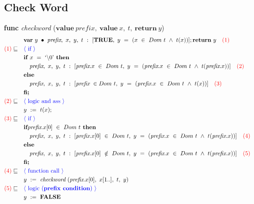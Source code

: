 \documentclass[a4paper, fleqn]{article}
\newcommand{\reason}[1]{\text{\textcolor{blue}{$\langle$ #1 $\rangle$}}}
\newcommand{\num}[1]{\text{\textcolor{red}{(#1)}}}
\begin{document}
\subsection{Check Word}
\textbf{func} \textit{checkword} ($\textbf{value}\ \textit{prefix},\ \textbf{value}\ x,\ t,\ \textbf{return}\ y$)
\begin{align*}
		&\quad \textbf{var}\ y\ \bullet\ \textit{prefix},\ x,\ y,\ t\ :\ [\textbf{TRUE},\ y\ =\ (x\ \in\ Dom\ t\ \land\ t(x))]; \textbf{return}\ y\quad\num{1} \\
		\num{1}\sqsubseteq&\quad\reason{if} \\
		&\quad \textbf{if }x\ =\ \text{`\textbackslash0'}\textbf{ then} \\
		&\qquad \textit{prefix},\ x,\ y,\ t\ :\ [\textit{prefix}.x\ \in\ Dom\ t,\ y\ =\ (\textit{prefix}.x\ \in\ Dom\ t\ \land\ t(\textit{prefix}.x))]\quad\num{2}\\
		&\quad\textbf{else} \\
		&\qquad \textit{prefix},\ x,\ y,\ t\ :\ [\textit{prefix}\ \in Dom\ t,\ y\ =\ (\textit{prefix}.x\ \in\ Dom\ t\ \land\ t(x))] \quad\num{3} \\
		&\quad\textbf{fi;} \\
		\num{2}\sqsubseteq&\quad\reason{logic and ass} \\
		&\quad y\ :=\ t(x); \\
		\num{3}\sqsubseteq&\quad\reason{if} \\
		&\quad\textbf{if} \textit{prefix}.x[0]\ \in\ Dom\ t\textbf{ then} \\
		&\qquad \textit{prefix},\ x,\ y,\ t\ :\ [\textit{prefix}.x[0]\ \in\ Dom\ t,\ y\ =\ (\textit{prefix}.x\ \in\ Dom\ t\ \land\ t(\textit{prefix}.x))]\quad\num{4} \\
		&\quad\textbf{else} \\
		&\qquad \textit{prefix},\ x,\ y,\ t\ :\ [\textit{prefix}.x[0]\ \notin\ Dom\ t,\ y\ =\ (\textit{prefix}.x\ \in\ Dom\ t\ \land\ t(\textit{prefix}.x))]\quad\num{5} \\
		&\quad\textbf{fi;} \\
		\num{4}\sqsubseteq&\quad\reason{function call} \\
		&\quad y\ :=\ \textit{checkword}\ (\textit{prefix}.x[0],\ x[1..],\ t,\ y) \\
		\num{5}\sqsubseteq&\quad\reason{logic (\textbf{prefix condition})} \\
		&\quad y\ :=\ \textbf{FALSE}
\end{align*}
\end{document}
